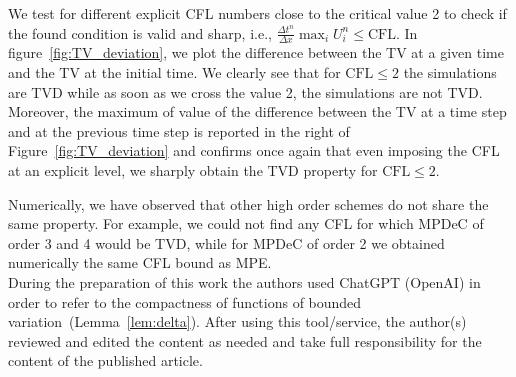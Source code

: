\documentclass[final,11pt, times, linenumber, nopreprintline]{elsarticle}
\begin{document}
We test for different explicit CFL numbers close to the critical value 2 to check if the found condition is valid and sharp, i.e., $\frac{\Delta t^n}{\Delta x} \max_i{U_i^n}\leq \text{CFL}$. In figure~\ref{fig:TV_deviation}, we plot the difference between the TV at a given time and the TV at the initial time. We clearly see that for $\text{CFL}\leq 2$ the simulations are TVD while as soon as we cross the value 2, the simulations are not TVD.
Moreover, the maximum of value of the difference between the TV at a time step and at the previous time step is reported in the right of Figure~\ref{fig:TV_deviation} and confirms once again that even imposing the CFL at an explicit level, we sharply obtain the TVD property for $\text{CFL}\leq 2$.

Numerically, we have observed that other high order schemes do not share the same property. For example, we could not find any CFL for which MPDeC of order 3 and 4 would be TVD, while for MPDeC of order 2 we obtained numerically the same CFL bound as MPE. \\

During the preparation of this work the authors used ChatGPT (OpenAI) in order to refer to the compactness of functions of bounded variation (Lemma \ref{lem:delta}). After using this tool/service, the author(s) reviewed and edited the content as needed and take full responsibility for the content of the published article.



\end{document}
